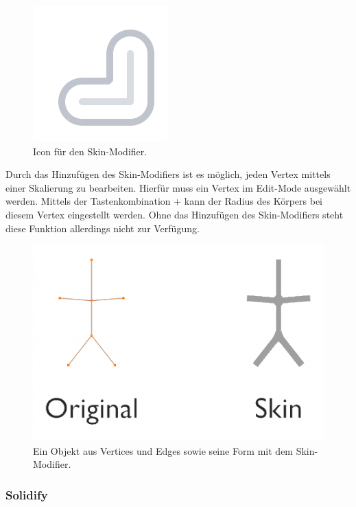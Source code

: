 \documentclass[
]{book}
\newcommand{\kbd}[1]{\fbox{\texttt{#1}}}
\begin{document}
\begin{figure}

\includegraphics{Chapters/Images/Chapter_14/14_20_Icon_Skin_modifier.png}

\caption{\label{fig-1_20}Icon für den Skin-Modifier.}

\end{figure}%

Durch das Hinzufügen des Skin-Modifiers ist es möglich, jeden Vertex
mittels einer Skalierung zu bearbeiten. Hierfür muss ein Vertex im
Edit-Mode ausgewählt werden. Mittels der Tastenkombination \kbd{Ctrl} +
\kbd{A} kann der Radius des Körpers bei diesem Vertex eingestellt
werden. Ohne das Hinzufügen des Skin-Modifiers steht diese Funktion
allerdings nicht zur Verfügung.

\begin{figure}

\includegraphics{Chapters/Images/Chapter_14/14_21_Example_Skin_modifier.png}

\caption{\label{fig-1_21}Ein Objekt aus Vertices und Edges sowie seine
Form mit dem Skin-Modifier.}

\end{figure}%

\subsubsection{Solidify}\label{solidify}
\end{document}
